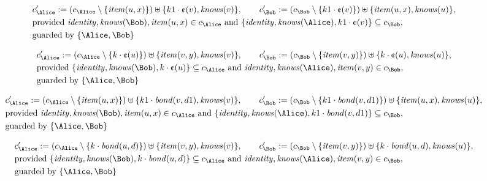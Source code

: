 \begin{align*}
&
c'_
{
\Alice
}
 := 
(c_
{
\Alice
}
 \setminus 
\{
\mathit{
item
}
(
u
,
x
)
\}
) \uplus 
\{
k1
\cdot
\text{\textcent}
(
v
)
,
\mathit{
knows
}
(
v
)
\}
, \qquad 
c'_
{
\Bob
}
 := 
(c_
{
\Bob
}
 \setminus 
\{
k1
\cdot
\text{\textcent}
(
v
)
\}
) \uplus 
\{
\mathit{
item
}
(
u
,
x
)
,
\mathit{
knows
}
(
u
)
\}
,\\
&
\text{provided } 
\mathit{
identity
}
,
\mathit{
knows
}
(
\Bob
)
,
\mathit{
item
}
(
u
,
x
)
 \in c_
{
\Alice
}
 \text{ and } 
\{
\mathit{
identity
}
,
\mathit{
knows
}
(
\Alice
)
,
k1
\cdot
\text{\textcent}
(
v
)
\}
 \subseteq c_
{
\Bob
}
,\\
&
\text{guarded by } \{
\Alice
,
\Bob
\}
\end{align*}

\begin{align*}
&
c'_
{
\Alice
}
 := 
(c_
{
\Alice
}
 \setminus 
\{
k
\cdot
\text{\textcent}
(
u
)
\}
) \uplus 
\{
\mathit{
item
}
(
v
,
y
)
,
\mathit{
knows
}
(
v
)
\}
, \qquad 
c'_
{
\Bob
}
 := 
(c_
{
\Bob
}
 \setminus 
\{
\mathit{
item
}
(
v
,
y
)
\}
) \uplus 
\{
k
\cdot
\text{\textcent}
(
u
)
,
\mathit{
knows
}
(
u
)
\}
,\\
&
\text{provided } 
\{
\mathit{
identity
}
,
\mathit{
knows
}
(
\Bob
)
,
k
\cdot
\text{\textcent}
(
u
)
\}
 \subseteq c_
{
\Alice
}
 \text{ and } 
\mathit{
identity
}
,
\mathit{
knows
}
(
\Alice
)
,
\mathit{
item
}
(
v
,
y
)
 \in c_
{
\Bob
}
,\\
&
\text{guarded by } \{
\Alice
,
\Bob
\}
\end{align*}

\begin{align*}
&
c'_
{
\Alice
}
 := 
(c_
{
\Alice
}
 \setminus 
\{
\mathit{
item
}
(
u
,
x
)
\}
) \uplus 
\{
k1
\cdot
\mathit{
bond
}
(
v
,
d1
)
,
\mathit{
knows
}
(
v
)
\}
, \qquad 
c'_
{
\Bob
}
 := 
(c_
{
\Bob
}
 \setminus 
\{
k1
\cdot
\mathit{
bond
}
(
v
,
d1
)
\}
) \uplus 
\{
\mathit{
item
}
(
u
,
x
)
,
\mathit{
knows
}
(
u
)
\}
,\\
&
\text{provided } 
\mathit{
identity
}
,
\mathit{
knows
}
(
\Bob
)
,
\mathit{
item
}
(
u
,
x
)
 \in c_
{
\Alice
}
 \text{ and } 
\{
\mathit{
identity
}
,
\mathit{
knows
}
(
\Alice
)
,
k1
\cdot
\mathit{
bond
}
(
v
,
d1
)
\}
 \subseteq c_
{
\Bob
}
,\\
&
\text{guarded by } \{
\Alice
,
\Bob
\}
\end{align*}

\begin{align*}
&
c'_
{
\Alice
}
 := 
(c_
{
\Alice
}
 \setminus 
\{
k
\cdot
\mathit{
bond
}
(
u
,
d
)
\}
) \uplus 
\{
\mathit{
item
}
(
v
,
y
)
,
\mathit{
knows
}
(
v
)
\}
, \qquad 
c'_
{
\Bob
}
 := 
(c_
{
\Bob
}
 \setminus 
\{
\mathit{
item
}
(
v
,
y
)
\}
) \uplus 
\{
k
\cdot
\mathit{
bond
}
(
u
,
d
)
,
\mathit{
knows
}
(
u
)
\}
,\\
&
\text{provided } 
\{
\mathit{
identity
}
,
\mathit{
knows
}
(
\Bob
)
,
k
\cdot
\mathit{
bond
}
(
u
,
d
)
\}
 \subseteq c_
{
\Alice
}
 \text{ and } 
\mathit{
identity
}
,
\mathit{
knows
}
(
\Alice
)
,
\mathit{
item
}
(
v
,
y
)
 \in c_
{
\Bob
}
,\\
&
\text{guarded by } \{
\Alice
,
\Bob
\}
\end{align*}
